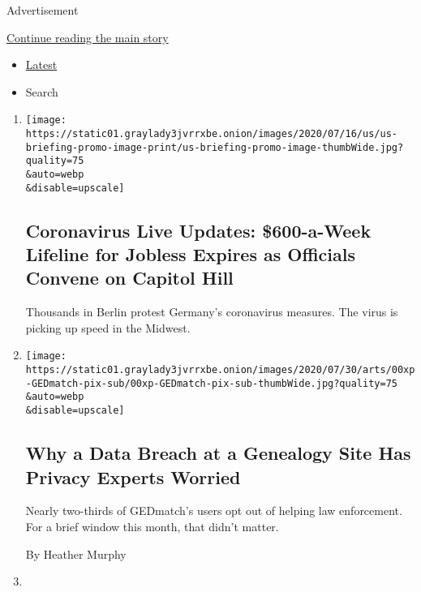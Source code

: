 Advertisement

\protect\hyperlink{after-mid1}{Continue reading the main story}

\begin{itemize}
\tightlist
\item
  \protect\hyperlink{stream-panel}{Latest}
\item
  Search
\end{itemize}

\begin{enumerate}
\def\labelenumi{\arabic{enumi}.}
\item
  \href{/2020/08/01/world/coronavirus-covid-19.html}{}

  \texttt{[image: https://static01.graylady3jvrrxbe.onion/images/2020/07/16/us/us-briefing-promo-image-print/us-briefing-promo-image-thumbWide.jpg?quality=75\\\&auto=webp\\\&disable=upscale]}

  \hypertarget{coronavirus-live-updates-600-a-week-lifeline-for-jobless-expires-as-officials-convene-on-capitol-hill}{%
  \subsection{Coronavirus Live Updates: \$600-a-Week Lifeline for
  Jobless Expires as Officials Convene on Capitol
  Hill}\label{coronavirus-live-updates-600-a-week-lifeline-for-jobless-expires-as-officials-convene-on-capitol-hill}}

  Thousands in Berlin protest Germany's coronavirus measures. The virus
  is picking up speed in the Midwest.
\item
  \href{/2020/08/01/technology/gedmatch-breach-privacy.html}{}

  \texttt{[image: https://static01.graylady3jvrrxbe.onion/images/2020/07/30/arts/00xp-GEDmatch-pix-sub/00xp-GEDmatch-pix-sub-thumbWide.jpg?quality=75\\\&auto=webp\\\&disable=upscale]}

  \hypertarget{why-a-data-breach-at-a-genealogy-site-has-privacy-experts-worried}{%
  \subsection{Why a Data Breach at a Genealogy Site Has Privacy Experts
  Worried}\label{why-a-data-breach-at-a-genealogy-site-has-privacy-experts-worried}}

  Nearly two-thirds of GEDmatch's users opt out of helping law
  enforcement. For a brief window this month, that didn't matter.

  By Heather Murphy
\item
  \href{/2020/07/31/health/coronavirus-children-camp.html}{}


\end{enumerate}
